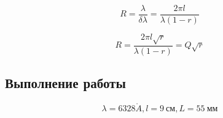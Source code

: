 \documentclass{lab}
\renewcommand{\AA}{\ensuremath{\mathring{A}}}
\begin{document}
\begin{equation}
R = \dfrac{\lambda}{\delta \lambda} = \dfrac{2\pi l}{\lambda(1-r)}
\end{equation}

\begin{equation}
R = \dfrac{2\pi l \sqrt{r}}{\lambda(1-r)} = Q\sqrt{r}
\end{equation}

\newpage

\subsection*{Выполнение работы}

\begin{equation}
\lambda = 6328 \AA, l = 9~см, L = 55~мм
\end{equation}
\end{document}
